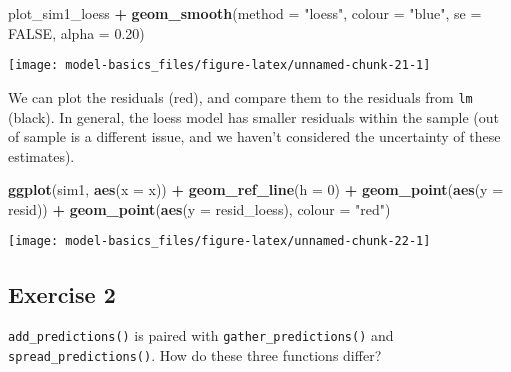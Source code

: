\documentclass[]{book}
\newenvironment{Shaded}{\begin{snugshade}}{\end{snugshade}}
\newcommand{\DataTypeTok}[1]{\textcolor[rgb]{0.13,0.29,0.53}{#1}}
\newcommand{\DecValTok}[1]{\textcolor[rgb]{0.00,0.00,0.81}{#1}}
\newcommand{\FloatTok}[1]{\textcolor[rgb]{0.00,0.00,0.81}{#1}}
\newcommand{\KeywordTok}[1]{\textcolor[rgb]{0.13,0.29,0.53}{\textbf{#1}}}
\newcommand{\NormalTok}[1]{#1}
\newcommand{\OperatorTok}[1]{\textcolor[rgb]{0.81,0.36,0.00}{\textbf{#1}}}
\newcommand{\OtherTok}[1]{\textcolor[rgb]{0.56,0.35,0.01}{#1}}
\newcommand{\StringTok}[1]{\textcolor[rgb]{0.31,0.60,0.02}{#1}}
\theoremstyle{plain}
\theoremstyle{remark}
\theoremstyle{definition}
\theoremstyle{definition}
\theoremstyle{definition}
\theoremstyle{remark}
\begin{document}
\begin{Shaded}
\begin{Highlighting}[]
\NormalTok{plot_sim1_loess }\OperatorTok{+}
\StringTok{  }\KeywordTok{geom_smooth}\NormalTok{(}\DataTypeTok{method =} \StringTok{"loess"}\NormalTok{, }\DataTypeTok{colour =} \StringTok{"blue"}\NormalTok{, }\DataTypeTok{se =} \OtherTok{FALSE}\NormalTok{, }\DataTypeTok{alpha =} \FloatTok{0.20}\NormalTok{)}
\end{Highlighting}
\end{Shaded}

\begin{center}\texttt{[image: model-basics\_files/figure-latex/unnamed-chunk-21-1]} \end{center}

We can plot the residuals (red), and compare them to the residuals from
\texttt{lm} (black). In general, the loess model has smaller residuals
within the sample (out of sample is a different issue, and we haven't
considered the uncertainty of these estimates).

\begin{Shaded}
\begin{Highlighting}[]
\KeywordTok{ggplot}\NormalTok{(sim1, }\KeywordTok{aes}\NormalTok{(}\DataTypeTok{x =}\NormalTok{ x)) }\OperatorTok{+}
\StringTok{  }\KeywordTok{geom_ref_line}\NormalTok{(}\DataTypeTok{h =} \DecValTok{0}\NormalTok{) }\OperatorTok{+}
\StringTok{  }\KeywordTok{geom_point}\NormalTok{(}\KeywordTok{aes}\NormalTok{(}\DataTypeTok{y =}\NormalTok{ resid)) }\OperatorTok{+}
\StringTok{  }\KeywordTok{geom_point}\NormalTok{(}\KeywordTok{aes}\NormalTok{(}\DataTypeTok{y =}\NormalTok{ resid_loess), }\DataTypeTok{colour =} \StringTok{"red"}\NormalTok{)}
\end{Highlighting}
\end{Shaded}

\begin{center}\texttt{[image: model-basics\_files/figure-latex/unnamed-chunk-22-1]} \end{center}

\hypertarget{exercise-2-61}{%
\subsection{Exercise 2}\label{exercise-2-61}}

\texttt{add\_predictions()} is paired with
\texttt{gather\_predictions()} and \texttt{spread\_predictions()}. How
do these three functions differ?
\end{document}
